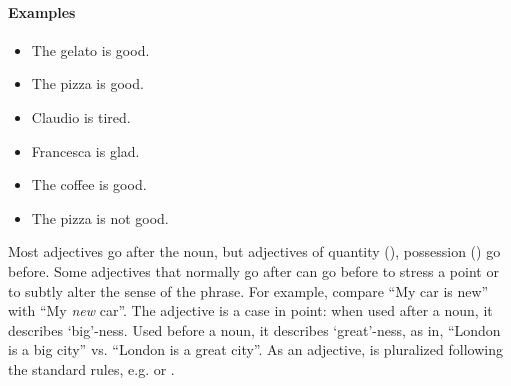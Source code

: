 \paragraph{Examples}
\begin{itemize}
    \item The gelato is good. \\
    \item The pizza is good. \\
    \item Claudio is tired. \\
    \item Francesca is glad. \\
    \item The coffee is good. \\
    \item The pizza is not good. \\
\end{itemize}
Most adjectives go after the noun, but adjectives of quantity (), possession 
() go before. Some adjectives that normally go after can go before 
to stress a point or to subtly alter the sense of the phrase. For example, compare 
``My car is new'' with ``My \textit{new} car''. The adjective  is a case in point: 
when used after a noun, it describes `big'-ness. Used before a noun, it describes `great'-ness, 
as in, ``London is a big city'' vs. ``London is a great city''. As an adjective, 
is pluralized following the standard rules, e.g.  or .

